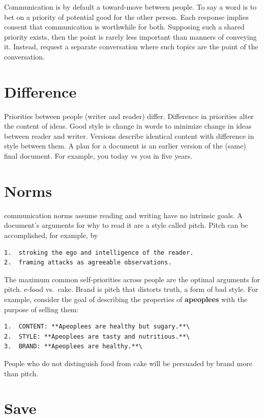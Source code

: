 \documentclass[
]{book}
\begin{document}
Communication is by default a toward-move between people.
To say a word is to bet on a priority of potential good for the other person.
Each response implies consent that communication is worthwhile for both.
Supposing such a shared priority exists, then the point is rarely less important than manners of conveying it.
Instead, request a separate conversation where such topics are the point of the conversation.

\section{Difference}\label{difference}

Priorities between people (writer and reader) differ.
Difference in priorities alter the content of ideas.
Good style is change in words to minimize change in ideas between reader and writer.
Versions describe identical content with difference in style between them.
A plan for a document is an earlier version of the (same) final document.
For example, you today vs you in five years.

\section{Norms}\label{comm-norm}

communication norms assume reading and writing have no intrinsic goals.
A document's arguments for why to read it are a style called pitch.
Pitch can be accomplished, for example, by

\begin{verbatim}
1.  stroking the ego and intelligence of the reader.
2.  framing attacks as agreeable observations.
\end{verbatim}

The maximum common self-priorities across people are the optimal arguments for pitch. e-food vs.~cake.
Brand is pitch that distorts truth, a form of bad style.
For example, consider the goal of describing the properties of \textbf{apeoplees} with the purpose of selling them:

\begin{verbatim}
1.  CONTENT: **Apeoplees are healthy but sugary.**\
2.  STYLE: **Apeoplees are tasty and nutritious.**\
3.  BRAND: **Apeoplees are healthy.**\
\end{verbatim}

People who do not distinguish food from cake will be persuaded by brand more than pitch.

\section{Save}\label{save}
\end{document}
